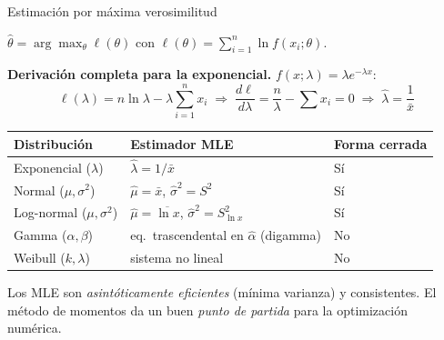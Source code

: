 \documentclass[aspectratio=1610, 10pt]{beamer}
\begin{document}
\begin{frame}{Estimación por máxima verosimilitud}
  \begin{definicionbox}[MLE]
    $\hat\theta = \arg\max_\theta \ell(\theta)$ con $\ell(\theta)=\sum_{i=1}^n \ln f(x_i;\theta)$.
  \end{definicionbox}

  \textbf{Derivación completa para la exponencial.}
  $f(x;\lambda)=\lambda e^{-\lambda x}$:
  \[
    \ell(\lambda) = n\ln\lambda - \lambda\sum_{i=1}^n x_i
    \;\Rightarrow\; \frac{d\ell}{d\lambda} = \frac{n}{\lambda}-\sum x_i = 0
    \;\Rightarrow\; \hat\lambda = \frac{1}{\bar x}
  \]

  \begin{center}\scriptsize
    \renewcommand{\arraystretch}{1.25}
    \begin{tabular}{lll}
      \toprule
      \textbf{Distribución} & \textbf{Estimador MLE} & \textbf{Forma cerrada} \\
      \midrule
      Exponencial ($\lambda$)     & $\hat\lambda=1/\bar x$ & Sí \\
      Normal ($\mu,\sigma^2$)     & $\hat\mu=\bar x$, $\hat\sigma^2=S^2$ & Sí \\
      Log-normal ($\mu,\sigma^2$) & $\hat\mu=\overline{\ln x}$, $\hat\sigma^2=S^2_{\ln x}$ & Sí \\
      Gamma ($\alpha,\beta$)      & eq.\ trascendental en $\hat\alpha$ (digamma) & No \\
      Weibull ($k,\lambda$)       & sistema no lineal & No \\
      \bottomrule
    \end{tabular}
  \end{center}

  \footnotesize Los MLE son \emph{asintóticamente eficientes} (mínima varianza)
  y consistentes. El método de momentos da un buen \emph{punto de partida}
  para la optimización numérica.
\end{frame}
\end{document}
